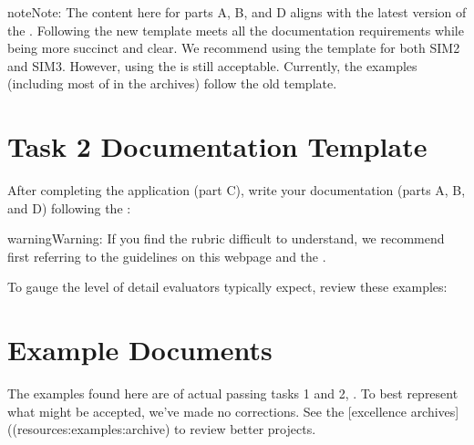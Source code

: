 \documentclass[letterpaper,10pt,english]{jupyterBook}
\begin{document}
\begin{sphinxadmonition}{note}{Note:}
\sphinxAtStartPar
The content here for parts A, B, and D aligns with the latest version of the . Following the new template meets all the documentation requirements while being more succinct and clear. We recommend using the template for both SIM2 and SIM3. However, using the  is still acceptable. Currently, the examples (including most of in the archives) follow the old template.
\end{sphinxadmonition}


\section{Task 2 Documentation Template}
\label{\detokenize{task2_doc/task2_doc:task-2-documentation-template}}\label{\detokenize{task2_doc/task2_doc:task2-doc}}
\sphinxAtStartPar
After completing the application (part C), write your documentation (parts A, B, and D) following the :
\begin{quote}

\sphinxAtStartPar
{}
\end{quote}

\begin{sphinxadmonition}{warning}{Warning:}
\sphinxAtStartPar
{} If you find the rubric difficult to understand, we recommend first referring to the guidelines on this webpage and the .
\end{sphinxadmonition}

\sphinxAtStartPar
To gauge the level of detail evaluators typically expect, review these examples:


\section{Example Documents}
\label{\detokenize{task2_doc/task2_doc:example-documents}}\label{\detokenize{task2_doc/task2_doc:task2-doc-examples}}
\sphinxAtStartPar
The examples found here are of actual passing tasks 1 and 2, . To best represent what might be accepted, we’ve made no corrections. See the {[}excellence archives{]}((resources:examples:archive) to review better projects.
\end{document}
